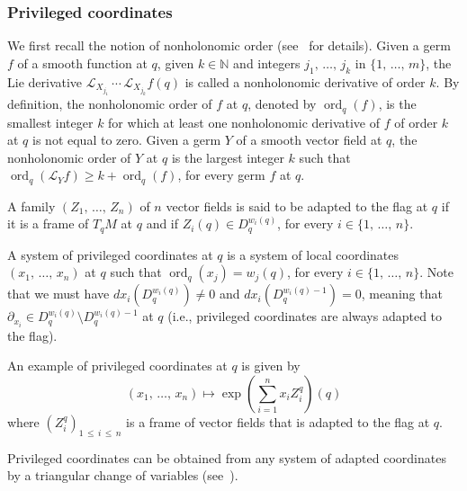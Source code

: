 \documentclass[AHL,Unicode,published]{cedram}
\newcommand*\N{\mathbb{N}}
\newcommand{\calL}{\mathcal{L}}
\DeclareMathOperator{\ord}{ord}
\renewcommand{\geq}{\geqslant}
\renewcommand{\leq}{\leqslant}
\begin{document}
\subsubsection{Privileged coordinates}
We first recall the notion of nonholonomic order (see~\cite{Bellaiche,Jean_2014,Mo-02} for details). Given a germ $f$ of a smooth function at $q$, given $k\in\N$ and integers $j_1,\,\ldots,\,j_k$ in $\{1,\,\ldots,\,m\}$, the Lie derivative $\calL_{X_{j_1}}\,\cdots\,\calL_{X_{j_k}}f(q)$ is called a nonholonomic derivative of order $k$. By definition, the nonholonomic order of $f$ at $q$, denoted by $\ord_{q}(f)$, is the smallest integer $k$ for which at least one nonholonomic derivative of $f$ of order $k$ at $q$ is not equal to zero. Given a germ $Y$ of a smooth vector field at $q$, the nonholonomic order of $Y$ at $q$ is the largest integer $k$ such that $\ord_{q}(\calL_Yf)\geq k+\ord_{q}(f)$, for every germ $f$ at $q$.

A family $(Z_1,\,\ldots,\,Z_n)$ of $n$ vector fields is said to be adapted to the flag at $q$ if it is a frame of $T_{q}M$ at $q$ and if $Z_i(q)\in D_{q}^{w_i(q)}$, for every $i\in\{1,\,\ldots,\,n\}$.

A system of privileged coordinates at $q$ is a system of local coordinates $(x_1,\,\ldots,\,x_n)$ at $q$ such that $\ord_{q}(x_j)=w_j(q)$, for every $i\in\{1,\,\ldots,\,n\}$. Note that we must have $dx_i(D_{q}^{w_i(q)})\neq 0$ and $dx_i(D_{q}^{w_i(q)-1})= 0$, meaning that $\partial_{x_i}\in D_{q}^{w_i(q)}\setminus D_{q}^{w_i(q)-1}$ at $q$ (i.e., privileged coordinates are always adapted to the flag).

An example of privileged coordinates at $q$ is given by
\begin{equation}\label{example_privileged}
(x_1,\,\ldots,\,x_n)\mapsto\exp \left(\sum_{i=1}^nx_i Z^q_i \right) (q)
\end{equation}
where $(Z^q_i)_{1\,\leq\,i\,\leq\,n}$ is a frame of vector fields that is adapted to the flag at $q$.

Privileged coordinates can be obtained from any system of adapted coordinates by a triangular change of variables (see~\cite{Jean_2014}).
\end{document}
